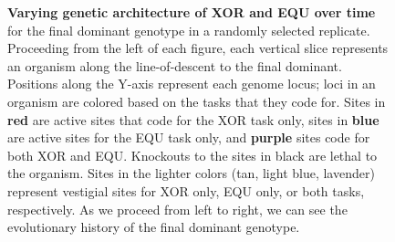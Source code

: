 \documentclass[PhD]{msu-thesis}
\begin{document}
	\begin{figure}[!h]
	\setlength{\fboxsep}{0pt}%
	\setlength{\fboxrule}{0pt}%
	\caption{\textbf{Varying genetic architecture of XOR and EQU over time} for the final dominant genotype in a randomly selected replicate. Proceeding from the left of each figure, each vertical slice represents an organism along the line-of-descent to the final dominant.
	Positions along the Y-axis represent each genome locus; loci in an organism are colored based on the tasks that they code for. Sites in \textbf{red} are active sites that code for the XOR task only, sites in \textbf{blue} are active sites for the EQU task only, and \textbf{purple} sites code for both XOR and EQU. Knockouts to the sites in black are lethal to the organism. Sites in the lighter colors (tan, light blue, lavender) represent vestigial sites for XOR only, EQU only, or both tasks, respectively. As we proceed from left to right, we can see the evolutionary history of the final dominant genotype.}
	\label{fig:lineage}
	\end{figure}
\end{document}
